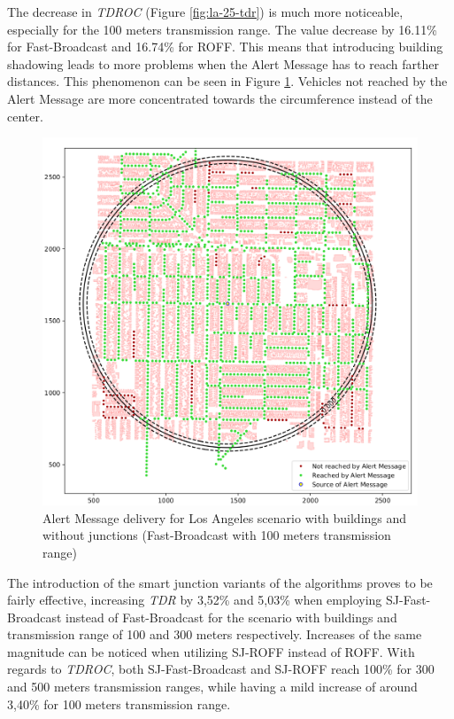 		
		The decrease in \textit{TDROC} (Figure \ref{fig:la-25-tdr}) is much more noticeable, especially for the 100 meters transmission range. The value decrease by 16.11\% for Fast-Broadcast and 16.74\% for ROFF. This means that introducing building shadowing leads to more problems when the Alert Message has to reach farther distances. This phenomenon can be seen in Figure \ref{fig:la-coverage-fb100}.
		Vehicles not reached by the Alert Message are more concentrated towards the circumference instead of the center.
		
		\begin{figure}[H]
			\centering
			\includegraphics[width=1.0\textwidth]{immagini/la-25/la-coverage-fb100}
			\caption{Alert Message delivery for Los Angeles scenario with buildings and without junctions (Fast-Broadcast with 100 meters transmission range)}
			\label{fig:la-coverage-fb100}
		\end{figure}
		
		The introduction of the smart junction variants of the algorithms proves to be fairly effective, increasing \textit{TDR} by 3,52\% and 5,03\% when employing SJ-Fast-Broadcast instead of Fast-Broadcast for the scenario with buildings and transmission range of 100 and 300 meters respectively. Increases of the same magnitude can be noticed when utilizing SJ-ROFF instead of ROFF. With regards to \textit{TDROC}, both SJ-Fast-Broadcast and SJ-ROFF reach 100\% for 300 and 500 meters transmission ranges, while having a mild increase of around 3,40\% for 100 meters transmission range.
		
